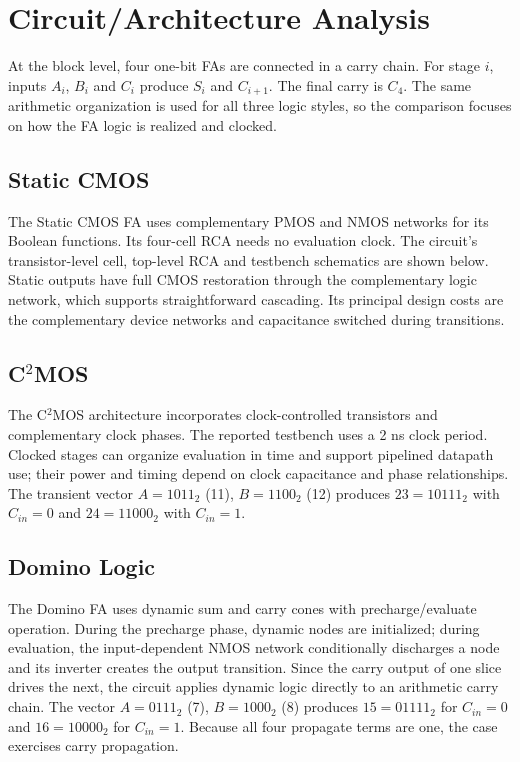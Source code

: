 \documentclass[11pt,a4paper]{article}
\begin{document}
\section{Circuit/Architecture Analysis}
At the block level, four one-bit FAs are connected in a carry chain. For stage $i$, inputs $A_i$, $B_i$ and $C_i$ produce $S_i$ and $C_{i+1}$. The final carry is $C_4$. The same arithmetic organization is used for all three logic styles, so the comparison focuses on how the FA logic is realized and clocked.

\subsection{Static CMOS}
The Static CMOS FA uses complementary PMOS and NMOS networks for its Boolean functions. Its four-cell RCA needs no evaluation clock. The circuit's transistor-level cell, top-level RCA and testbench schematics are shown below. Static outputs have full CMOS restoration through the complementary logic network, which supports straightforward cascading. Its principal design costs are the complementary device networks and capacitance switched during transitions.

\subsection{C$^{2}$MOS}
The C$^{2}$MOS architecture incorporates clock-controlled transistors and complementary clock phases. The reported testbench uses a 2 ns clock period. Clocked stages can organize evaluation in time and support pipelined datapath use; their power and timing depend on clock capacitance and phase relationships. The transient vector $A=1011_2$ (11), $B=1100_2$ (12) produces $23=10111_2$ with $C_{in}=0$ and $24=11000_2$ with $C_{in}=1$.

\subsection{Domino Logic}
The Domino FA uses dynamic sum and carry cones with precharge/evaluate operation. During the precharge phase, dynamic nodes are initialized; during evaluation, the input-dependent NMOS network conditionally discharges a node and its inverter creates the output transition. Since the carry output of one slice drives the next, the circuit applies dynamic logic directly to an arithmetic carry chain. The vector $A=0111_2$ (7), $B=1000_2$ (8) produces $15=01111_2$ for $C_{in}=0$ and $16=10000_2$ for $C_{in}=1$. Because all four propagate terms are one, the case exercises carry propagation.
\end{document}
